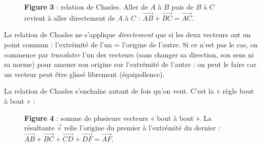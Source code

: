 \documentclass[11pt,a4paper]{article}
\newcommand{\vc}[1]{\overrightarrow{#1}}        %
\begin{document}
\begin{figure}[h]
\centering
{}
\caption{\textbf{\textcolor{primary}{Figure 3}} : relation de Chasles. Aller de $A$ à $B$ puis de $B$ à $C$
revient à aller directement de $A$ à $C$ : $\vc{AB}+\vc{BC}=\vc{AC}$.}
\label{fig:chasles}
\end{figure}

\begin{attention}
La relation de Chasles ne s'applique \emph{directement} que si les deux vecteurs ont un point commun :
l'extrémité de l'un = l'origine de l'autre. Si ce n'est pas le cas, on commence par \emph{translater}
l'un des vecteurs (sans changer sa direction, son sens ni sa norme) pour amener son origine sur
l'extrémité de l'autre : on peut le faire car un vecteur peut être glissé librement (équipollence).
\end{attention}

La relation de Chasles s'enchaîne autant de fois qu'on veut. C'est la « règle bout à bout » :

\begin{figure}[h]
\centering
{}
\caption{\textbf{\textcolor{primary}{Figure 4}} : somme de plusieurs vecteurs « bout à bout ». La résultante
$\vec{v}$ relie l'origine du premier à l'extrémité du dernier :
$\vc{AB}+\vc{BC}+\vc{CD}+\vc{DF}=\vc{AF}$.}
\label{fig:somme3}
\end{figure}
\end{document}
